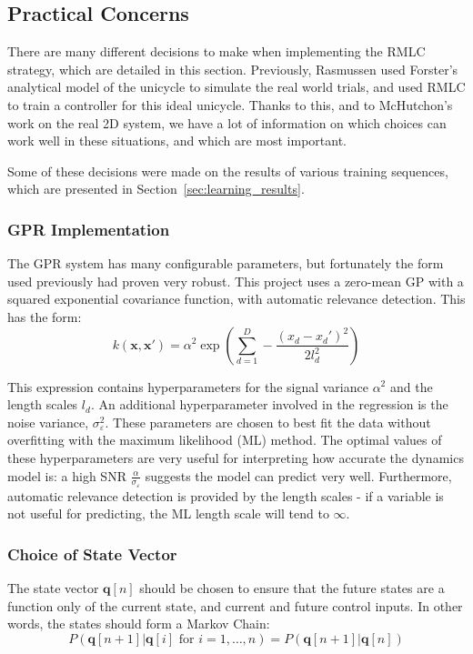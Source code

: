 \documentclass{IIBproject}
\begin{document}
\subsection{Practical Concerns}

There are many different decisions to make when implementing the RMLC
strategy, which are detailed in this section. Previously, Rasmussen used
Forster's analytical model of the unicycle to simulate the real world trials,
and used RMLC to train a controller for this ideal unicycle. Thanks to this,
and to McHutchon's work on the real 2D system, we have a lot of information on
which choices can work well in these situations, and which are most important.

Some of these decisions were made on the results of various training
sequences, which are presented in Section~\ref{sec:learning_results}.

\subsubsection{GPR Implementation}
The GPR system has many configurable parameters, but fortunately the form used
previously had proven very robust. This project uses a zero-mean GP with a
squared exponential covariance function, with automatic relevance detection.
This has the form:
\[
  k(\boldsymbol{x}, \boldsymbol{x}') = \alpha^2 \exp \left(\sum_{d=1}^D -
  \frac{(x_d-x_d')^2}{2 l_d^2}\right)
\]

This expression contains hyperparameters for the signal variance $\alpha^2$
and the length scales $l_d$. An additional hyperparameter involved in the
regression is the noise variance, $\sigma_\varepsilon^2$. These parameters are
chosen to best fit the data without overfitting with the maximum likelihood
(ML) method\cite{ref:gpml}. The optimal values of these hyperparameters are
very useful for interpreting how accurate the dynamics model is: a high SNR
$\frac{\alpha}{\sigma_\varepsilon}$ suggests the model can predict very
well.  Furthermore, automatic relevance detection is provided by the length
scales - if a variable is not useful for predicting, the ML length scale will
tend to $\infty$.

\subsubsection{Choice of State Vector}
\label{sec:state_vector}

The state vector $\boldsymbol{q}[n]$ should be chosen to ensure that the
future states are a function only of the current state, and current and future
control inputs. In other words, the states should form a Markov Chain:
\[
  P(\boldsymbol{q}[n+1] | \boldsymbol{q}[i]\textrm{ for } i = 1, \dots, n)
  = P(\boldsymbol{q}[n+1] | \boldsymbol{q}[n])
\]
\end{document}
